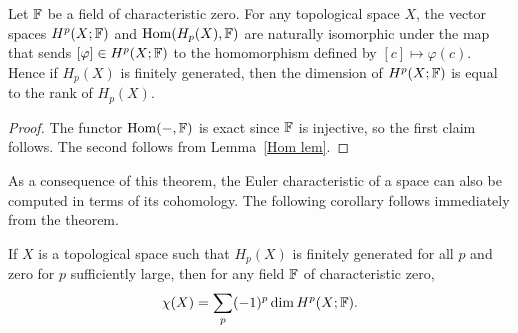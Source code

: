 \begin{theorem}
Let $\mathbb{F}$ be a field of characteristic zero. For any topological space $X$, the vector spaces $H^p(X;\mathbb{F})$ and $\mathrm{Hom}(H_p(X),\mathbb{F})$ are naturally isomorphic under
the map that sends $[\varphi]\in H^p(X;\mathbb{F})$ to the homomorphism defined by $[c]\mapsto\varphi(c)$. Hence if $H_p(X)$ is finitely generated, then the dimension of $H^p(X;\mathbb{F})$ is equal to the rank of $H_p(X)$.
\end{theorem}
\begin{proof}
The functor $\mathrm{Hom}(-,\mathbb{F})$ is exact since $\mathbb{F}$ is injective, so the first claim follows. The second follows from Lemma~\ref{Hom lem}.
\end{proof}
As a consequence of this theorem, the Euler characteristic of a space can also be computed in terms of its cohomology. The following corollary follows immediately from the theorem.
\begin{corollary}
If $X$ is a topological space such that $H_p(X)$ is finitely generated for all $p$ and zero for $p$ sufficiently large, then for any field $\mathbb{F}$ of characteristic zero,
\[\chi(X)=\sum_p(-1)^p\dim H^p(X;\mathbb{F}).\]
\end{corollary}
